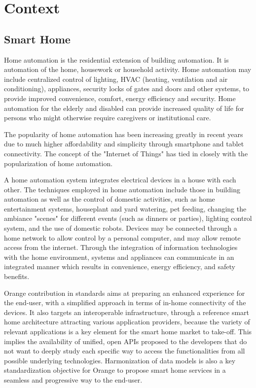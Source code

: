 
\section{Context}
\subsection{Smart Home}

Home automation \cite{homeautomation} is the residential extension of building automation. It is automation of the home, housework or household activity. Home automation may include centralized control of lighting, HVAC (heating, ventilation and air conditioning), appliances, security locks of gates and doors and other systems, to provide improved convenience, comfort, energy efficiency and security. Home automation for the elderly and disabled can provide increased quality of life for persons who might otherwise require caregivers or institutional care.

The popularity of home automation has been increasing greatly in recent years due to much higher affordability and simplicity through smartphone and tablet connectivity. The concept of the "Internet of Things" has tied in closely with the popularization of home automation.

A home automation system \cite{homeautomation1} integrates electrical devices in a house with each other. The techniques employed in home automation include those in building automation as well as the control of domestic activities, such as home entertainment systems, houseplant and yard watering, pet feeding, changing the ambiance "scenes" for different events (such as dinners or parties), lighting control system, and the use of domestic robots. Devices may be connected through a home network to allow control by a personal computer, and may allow remote access from the internet. Through the integration of information technologies with the home environment, systems and appliances can communicate in an integrated manner which results in convenience, energy efficiency, and safety benefits.

Orange contribution in standards aims at preparing an enhanced experience for the end-user, with a simplified approach in terms of in-home connectivity of the devices. It also targets an interoperable infrastructure, through a reference smart home architecture attracting various application providers, because the variety of relevant applications is a key element for the smart home market to take-off. This implies the availability of unified, open APIs proposed to the developers that do not want to deeply study each specific way to access the functionalities from all possible underlying technologies. Harmonization of data models is also a key standardization objective for Orange to propose smart home services in a seamless and progressive way to the end-user.
